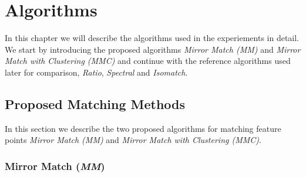 \chapter{Algorithms}
\label{C:Algorithms}

In this chapter we will describe the algorithms used in the experiements
in detail. We start by introducing the proposed algorithms \emph{Mirror 
Match (MM)} and \emph{Mirror Match with Clustering (MMC)} and continue 
with the reference algorithms used later for comparison, \emph{Ratio}, 
\emph{Spectral} and \emph{Isomatch}.

\section{Proposed Matching Methods}
\label{S:MatchingMethods}
In this section we describe the two proposed algorithms for matching 
feature points \emph{Mirror Match
(MM)} and \emph{Mirror Match with Clustering (MMC)}. 

\subsection{Mirror Match (\emph{MM})}

